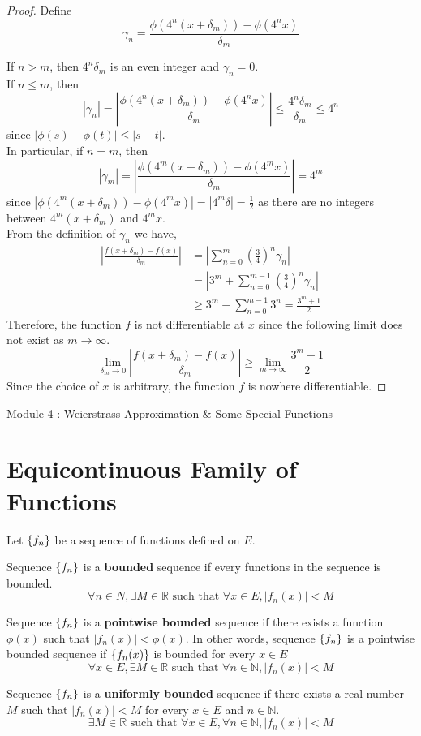 \begin{proof}
	Define
	\[\gamma_n = \frac{\phi(4^n(x+\delta_m)) - \phi(4^n x)}{\delta_m} \]

	If $n > m$, then $4^n \delta_m$ is an even integer and $\gamma_n = 0$.\\
	If $n \le m$, then 
	\[ |\gamma_n| = \left|\frac{\phi(4^n(x+\delta_m)) - \phi(4^n x)}{\delta_m} \right| \le \frac{4^n \delta_m }{\delta_m} \le 4^n \]
	since $|\phi(s)-\phi(t)| \le |s-t|$.\\
	In particular, if $n = m$, then
	\[ |\gamma_m| = \left| \frac{\phi(4^m(x+\delta_m))-\phi(4^m x)}{\delta_m} \right| = 4^m \]
	since $|\phi(4^m (x+\delta_m)) - \phi(4^m x)| = |4^m \delta| = \frac{1}{2}$ as there are no integers between $4^m(x+\delta_m)$ and $4^m x$.\\

	From the definition of $\gamma_n$ we have,
	\begin{align*}
	 \left| \frac{f(x+\delta_m) - f(x)}{\delta_m} \right| 
		& = \left| \sum_{n = 0}^m \left( \frac{3}{4} \right)^n \gamma_n \right| \\
		& = \left| 3^m + \sum_{n = 0}^{m-1} \left( \frac{3}{4} \right)^n \gamma_n \right| \\
		& \ge 3^m - \sum_{n = 0}^{m-1} 3^n = \frac{3^m+1}{2}
	\end{align*}
	Therefore, the function $f$ is not differentiable at $x$ since the following limit does not exist as $m \to \infty$.
	\[ \lim_{\delta_m \to 0} \left| \frac{f(x+\delta_m) - f(x)}{\delta_m} \right| \ge \lim_{m \to \infty} \frac{3^m+1}{2} \]
	Since the choice of $x$ is arbitrary, the function $f$ is nowhere differentiable.
\end{proof}

\pagebreak
{\Large Module 4 : Weierstrass Approximation \& Some Special Functions}
\section{Equicontinuous Family of Functions}
\begin{definition}
	Let $\left\{f_n\right\}$ be a sequence of functions defined on $E$.\\
	{\color{red}
	Sequence $\left\{f_n\right\}$ is a \textbf{bounded} sequence if every functions in the sequence is bounded.
	\[ \forall n \in N, \exists M \in \mathbb{R} \text{ such that } \forall x \in E, |f_n(x)|<M \]

	Sequence $\left\{f_n\right\}$ is a \textbf{pointwise bounded} sequence if there exists a function $\phi(x)$ such that $|f_n(x)| < \phi(x)$.
	In other words, sequence $\left\{f_n\right\}$ is a pointwise bounded sequence if $\left\{f_n(x)\right\}$ is bounded for every $x \in E$
	\[ \forall x \in E, \exists M \in \mathbb{R} \text{ such that } \forall n \in \mathbb{N}, |f_n(x)| < M \]
	}

	Sequence $\left\{f_n\right\}$ is a \textbf{uniformly bounded} sequence if there exists a real number $M$ such that $|f_n(x)| < M$ for every $x \in E$ and $n \in \mathbb{N}$.
	\[ \exists M \in \mathbb{R} \text{ such that } \forall x \in E, \forall n \in \mathbb{N}, |f_n(x)| < M \]
\end{definition}
